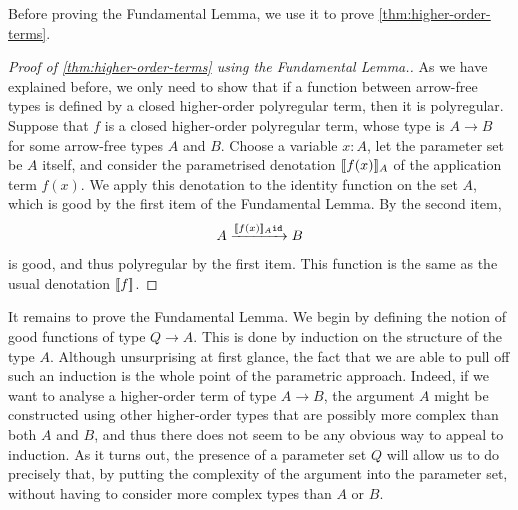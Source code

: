Before proving the Fundamental Lemma, we use it to prove \cref{thm:higher-order-terms}. 
\begin{proof}[Proof of \cref{thm:higher-order-terms} using the Fundamental Lemma.]  As we have explained before, we only need to show that if a function between arrow-free types is defined by a closed higher-order polyregular term, then it is polyregular.  Suppose that $f$ is a closed higher-order polyregular term, whose type is $A \to B$ for some arrow-free types $A$ and $B$. Choose a variable $x : A$, let the parameter set be $A$ itself, and  consider the parametrised denotation $[\![f(x)]\!]_A$ of the application term $f(x)$. We apply this denotation to the identity function on the set $A$, which is good by the first item of the Fundamental Lemma. By the second item, 
    \begin{align*}
   A \xrightarrow{[\![f(x)]\!]_A \mathtt{id}}B
    \end{align*}
    is good, and thus polyregular by the first item.  This function is the same as the usual denotation $[\![f]\!]$.
\end{proof}


It remains to prove the Fundamental Lemma. We begin by defining the notion of good functions of type $Q \to A$. This is done by induction on the structure of the type $A$. Although unsurprising at first glance, the fact that we are able to pull off such an induction is the whole point of the parametric approach.  Indeed, if we want to analyse a higher-order term of type $A \to B$, the argument $A$ might be constructed using other higher-order types that are possibly more complex than both $A$ and $B$, and thus there does not seem to be any obvious way to appeal to induction. As it turns out, the presence of a parameter set $Q$ will allow us to do precisely that, by putting the complexity of the argument into the parameter set, without having to consider more complex types than $A$ or $B$.

